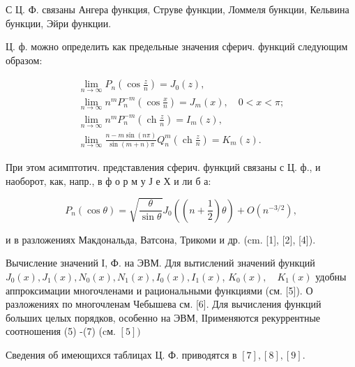 \documentclass[10pt]{article}
\begin{document}
С Ц. Ф. связаны Ангера функция, Струве функции, Ломмеля бункции, Кельвина бункции, Эйри функции.



Ц. ф. можно определить как предельные значения сферич. функций следующим образом:



\[

\begin{gathered}

\lim _{n \rightarrow \infty} P_{n}\left(\cos \frac{z}{n}\right)=J_{0}(z), \\

\lim _{n \rightarrow \infty} n^{m} P_{n}^{-m}\left(\cos \frac{x}{n}\right)=J_{m}(x), \quad 0<x<\pi ; \\

\lim _{n \rightarrow \infty} n^{m} P_{n}^{-m}\left(\operatorname{ch} \frac{z}{n}\right)=I_{m}(z), \\

\lim _{n \rightarrow \infty} \frac{n-m \sin (n \pi)}{\sin (m+n) \pi} Q_{n}^{m}\left(\operatorname{ch} \frac{z}{n}\right)=K_{m}(z) .

\end{gathered}

\]



При этом асимптотич. представления сферич. функций связаны с Ц. ф., и наоборот, как, напр., в ф о р м у Ј е Х и ли б а:



\[

P_{n}(\cos \theta)=\sqrt{\frac{\theta}{\sin \theta}} J_{0}\left(\left(n+\frac{1}{2}\right) \theta\right)+O\left(n^{-3 / 2}\right),

\]



и в разложениях Макдональда, Ватсона, Трикоми и др. (cm. [1], [2], [4]).



Вычисление значений І, Ф. на ЭВМ. Для вытислений значений функций $J_{0}(x), J_{1}(x), N_{0}(x), N_{1}(x), I_{0}(x), I_{1}(x)$, $K_{0}(x), \quad K_{1}(x)$ удобны аппроксимации многочленами и рациональными функциями (см. [5]). О разложениях по многочленам Чебышева см. [6]. Для вычисления функций больших целых порядков, особенно на ЭВМ, ІІрименяются рекуррентные соотношения (5) -(7) (cм. $[5])$



Сведения об имеющихся таблицах Ц. Ф. приводятся в $[7],[8],[9]$.
\end{document}
